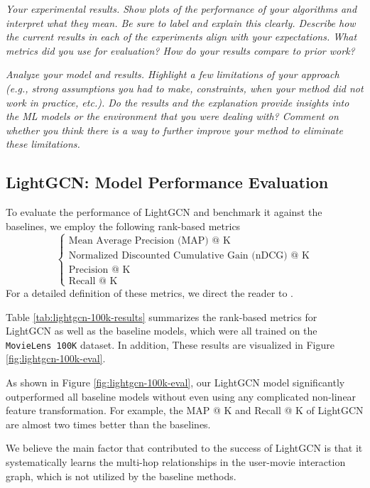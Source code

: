 \documentclass{article}
\begin{document}
\textit{Your experimental results. Show plots of the performance of your algorithms and interpret what they mean. Be sure to label and explain this clearly. Describe how the current results in each of the experiments align with your expectations. What metrics did you use for evaluation? How do your results compare to prior work?}

\textit{Analyze your model and results. Highlight a few limitations of your approach (e.g., strong assumptions you had to make, constraints, when your method did not work in practice, etc.). Do
the results and the explanation provide insights into the ML models or the environment that you were dealing with? Comment on whether you think there is a way to further improve your method to eliminate these limitations.}

\subsection{LightGCN: Model Performance Evaluation} \label{lightgcn-eval}

To evaluate the performance of LightGCN and benchmark it against the baselines, we employ the following rank-based metrics
$$
\begin{cases}
\text{Mean Average Precision (MAP) @ K} \\
\text{Normalized Discounted Cumulative Gain (nDCG) @ K} \\
\text{Precision @ K} \\
\text{Recall @ K}
\end{cases}
$$
For a detailed definition of these metrics, we direct the reader to \cite{metrics}.

Table \ref{tab:lightgcn-100k-results} summarizes the rank-based metrics for LightGCN as well as the baseline models, which were all trained on the \texttt{MovieLens 100K} dataset. In addition, These results are visualized in Figure \ref{fig:lightgcn-100k-eval}.

As shown in Figure \ref{fig:lightgcn-100k-eval}, our LightGCN model significantly outperformed all baseline models without even using any complicated non-linear feature transformation. For example, the MAP @ K and Recall @ K of LightGCN are almost two times better than the baselines.

We believe the main factor that contributed to the success of LightGCN is that it systematically learns the multi-hop relationships in the user-movie interaction graph, which is not utilized by the baseline methods.
\end{document}
